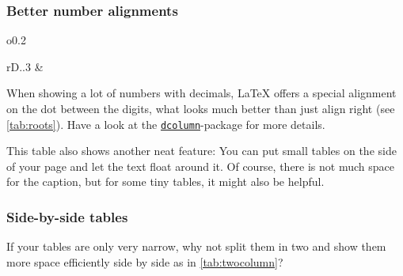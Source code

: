 \documentclass[\myrootdir/main.tex]{subfiles}
\begin{document}
\clearpage %
\phantom{.}\vspace{-4em} %
\subsubsection{Better number alignments}

\begin{wraptable}{o}{0.2\textwidth}
\vspace{-4em} %
\centering
\begin{tabular}{rD{.}{.}{3}}
\toprule
  &  \\
\midrule
{}%
\end{tabular}
\caption{Square~roots}
\label{tab:roots}
\vspace{-2.5em} %
\end{wraptable}

When showing a lot of numbers with decimals, LaTeX offers a special alignment on the dot between the digits, what looks much better than just align right (see \cref{tab:roots}).
Have a look at the \href{https://ctan.org/pkg/dcolumn}{\texttt{dcolumn}}-package for more details.

This table also shows another neat feature:
You can put small tables on the side of your page and let the text float around it.
Of course, there is not much space for the caption, but for some tiny tables, it might also be helpful.

\subsubsection{Side-by-side tables}

If your tables are only very narrow, why not split them in two and show them more space efficiently side by side as in \cref{tab:twocolumn}?
\end{document}
